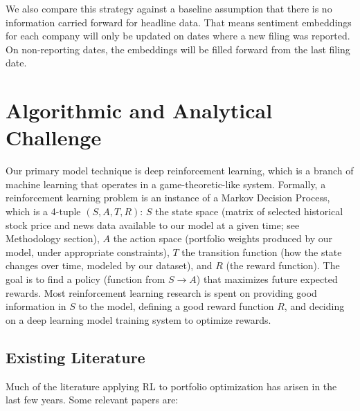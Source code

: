 We also compare this strategy against a baseline assumption that there is no information carried forward for headline data. That means sentiment embeddings for each company will only be updated on dates where a
new filing was reported. On non-reporting dates, the embeddings will be filled 
forward from the last filing date. 


\section{Algorithmic and Analytical Challenge}

Our primary model technique is deep reinforcement learning, which is a 
branch of machine learning that operates in a game-theoretic-like system. 
Formally, a reinforcement learning problem is an instance of a Markov 
Decision Process, which is a 4-tuple $(S, A, T, R)$: $S$ the state space 
(matrix of selected historical stock price and news data available to 
our model at a given time; see Methodology section), $A$ the action space 
(portfolio weights produced by our model, under appropriate constraints), 
$T$ the transition function (how the state changes over time, modeled by our dataset), 
and $R$ (the reward function). The goal is to find a policy (function from $S \to A$) 
that maximizes future expected rewards. Most reinforcement learning research is 
spent on providing good information in $S$ to the model, defining a good reward 
function $R$, and deciding on a deep learning model training system to optimize rewards.

\subsection{Existing Literature}

Much of the literature applying RL to portfolio optimization has arisen in the 
last few years. Some relevant papers are:

